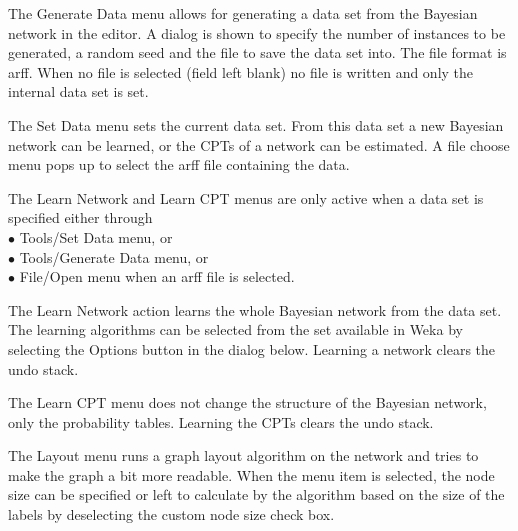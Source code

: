 \documentclass[a4paper]{article}
\begin{document}
\begin{center}
\end{center}


The Generate Data menu allows for generating a data set from the Bayesian
network in the editor. A dialog is shown to specify the number of instances
to be generated, a random seed and the file to save the data set into. The
file format is arff. When no file is selected (field left blank) no file is 
written and only the internal data set is set.

\begin{center}
\end{center}

The Set Data menu sets the current data set. From this data set a new
Bayesian network can be learned, or the CPTs of a network can be estimated.
A file choose menu pops up to select the arff file containing the data.

The Learn Network and Learn CPT menus are only active when a data set is 
specified either through
\\$\bullet$ Tools/Set Data menu, or
\\$\bullet$ Tools/Generate Data menu, or
\\$\bullet$ File/Open menu when an arff file is selected.

The Learn Network action learns the whole Bayesian network from the data set.
The learning algorithms can be selected from the set available in Weka
by selecting the Options button in the dialog below.
Learning a network clears the undo stack.

\begin{center}
\end{center}

The Learn CPT menu does not change the structure of the Bayesian network,
only the probability tables.
Learning the CPTs clears the undo stack.

The Layout menu runs a graph layout algorithm on the network and tries to 
make the graph a bit more readable. When the menu item is selected, the node
size can be specified or left to calculate by the algorithm based on the size
of the labels by deselecting the custom node size check box.

\begin{center}
\end{center}
\end{document}
